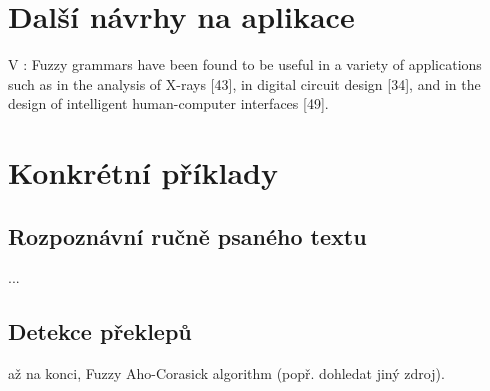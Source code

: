 \documentclass[a4paper,10pt]{article}
\begin{document}

\newpage

\section{Další návrhy na aplikace}
V \cite{OmlThoGil-FuzzFinStaAutCanDetEncIntRecNeuNet}: 
Fuzzy grammars have been found to be useful in a variety
of applications such as in the analysis of X-rays [43], in
digital circuit design [34], and in the design of intelligent
human-computer interfaces [49].




\section{Konkrétní příklady}
\subsection{Rozpoznávní ručně psaného textu}
...

\subsection{Detekce překlepů}
\cite{AndAbdAsm-ApprPattMatcFuzzLog} až na konci,  Fuzzy Aho-Corasick algorithm (popř. dohledat jiný zdroj).
\newpage


\end{document}
